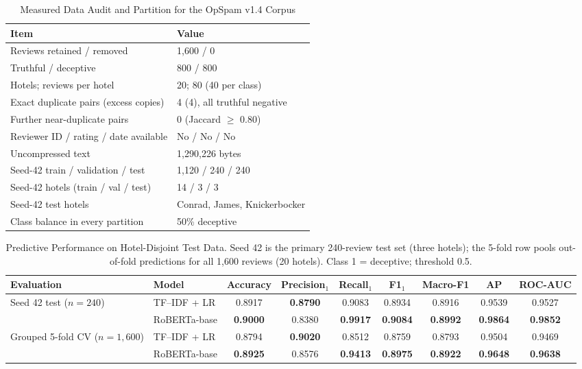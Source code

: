 \begin{table}[t]
\centering
\caption{Measured Data Audit and Partition for the OpSpam v1.4 Corpus}
\label{tab:data}
\footnotesize
\begin{tabular}{@{}p{}p{}@{}}
\toprule
Item & Value \\
\midrule
Reviews retained / removed & 1,600 / 0 \\
Truthful / deceptive & 800 / 800 \\
Hotels; reviews per hotel & 20; 80 (40 per class) \\
Exact duplicate pairs (excess copies) & 4 (4), all truthful negative \\
Further near-duplicate pairs & 0 (Jaccard $\ge$ 0.80) \\
Reviewer ID / rating / date available & No / No / No \\
Uncompressed text & 1,290,226 bytes \\
Seed-42 train / validation / test & 1,120 / 240 / 240 \\
Seed-42 hotels (train / val / test) & 14 / 3 / 3 \\
Seed-42 test hotels & Conrad, James, Knickerbocker \\
Class balance in every partition & 50\% deceptive \\
\bottomrule
\end{tabular}
\end{table}

\begin{table}[t]
\centering
\caption{Predictive Performance on Hotel-Disjoint Test Data. Seed 42 is the primary 240-review test set (three hotels); the 5-fold row pools out-of-fold predictions for all 1,600 reviews (20 hotels). Class 1 = deceptive; threshold 0.5.}
\label{tab:main}
\footnotesize
\begin{tabular}{@{}llccccccc@{}}
\toprule
Evaluation & Model & Accuracy & Precision$_1$ & Recall$_1$ & F1$_1$ & Macro-F1 & AP & ROC-AUC \\
\midrule
Seed 42 test ($n=240$) & TF--IDF + LR & 0.8917 & \textbf{0.8790} & 0.9083 & 0.8934 & 0.8916 & 0.9539 & 0.9527 \\
 & RoBERTa-base & \textbf{0.9000} & 0.8380 & \textbf{0.9917} & \textbf{0.9084} & \textbf{0.8992} & \textbf{0.9864} & \textbf{0.9852} \\
\addlinespace
Grouped 5-fold CV ($n=1{,}600$) & TF--IDF + LR & 0.8794 & \textbf{0.9020} & 0.8512 & 0.8759 & 0.8793 & 0.9504 & 0.9469 \\
 & RoBERTa-base & \textbf{0.8925} & 0.8576 & \textbf{0.9413} & \textbf{0.8975} & \textbf{0.8922} & \textbf{0.9648} & \textbf{0.9638} \\
\bottomrule
\end{tabular}
\end{table}
